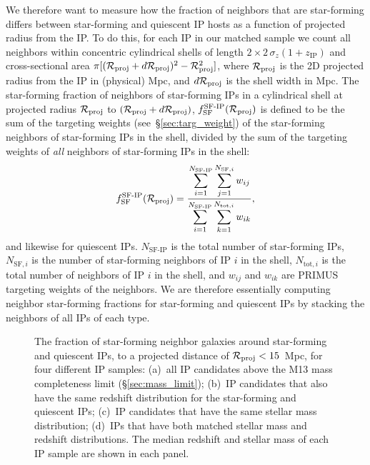 We therefore want to measure how the fraction of neighbors that are star-forming differs 
between star-forming and quiescent IP hosts as a function of projected radius from 
the IP.
To do this, for each IP in our matched sample we count all neighbors within 
concentric cylindrical shells of length ${2\times2\,\sigma_{z}(1+z_{\text{IP}})}$
and cross-sectional area
${\pi[(\mathcal{R}_{\text{proj}}+d\mathcal{R}_{\text{proj}})^2-\mathcal{R}_{\text{proj}}^2]}$, where $\mathcal{R}_{\text{proj}}$ is the 2D projected radius from the IP in (physical) Mpc, and $d\mathcal{R}_{\text{proj}}$ is the shell width in Mpc.
The star-forming fraction of neighbors of star-forming IPs in a cylindrical shell 
at projected radius $\mathcal{R}_{\text{proj}}$ to ${(\mathcal{R}_{\text{proj}}+d\mathcal{R}_{\text{proj}})}$, $f^{\textrm{SF-IP}}_{\textrm{SF}}
(\mathcal{R}_{\text{proj}})$ is defined to be the sum of the targeting weights (see~\S\ref{sec:targ_weight}) of the star-forming neighbors of star-forming IPs in the shell, 
divided by the sum of the
targeting weights of \emph{all} neighbors of star-forming IPs in the shell:
\begin{equation}
        f^{\textrm{SF-IP}}_{\textrm{SF}}(\Rproj) = \frac
        {\displaystyle \sum_{i=1}^{N_{\textrm{SF-IP}}} \sum_{j=1}^{N_{\textrm{SF},i}} w_{ij} }
        {\displaystyle \sum_{i=1}^{N_{\textrm{SF-IP}}} \sum_{k=1}^{N_{\textrm{tot},i}} w_{ik} },
\label{eq:SFfrac}
\end{equation}
and likewise for quiescent IPs.
$N_{\textrm{SF-IP}}$ is the total number of star-forming IPs, $N_{\textrm{SF},i}$ is the number of star-forming neighbors of IP $i$ in the shell, $N_{\textrm{tot},i}$ is the
total number of neighbors of IP $i$ in the shell, and $w_{ij}$ and $w_{ik}$ are PRIMUS targeting weights of the neighbors.
We are therefore essentially computing neighbor star-forming fractions for star-forming 
and quiescent IPs by stacking the neighbors of all IPs of each type.

\begin{figure*}
  \epstrim{0.1in 0.3in 0.4in 0.8in}
  \caption{
The fraction of star-forming neighbor galaxies around star-forming 
and quiescent IPs, to a projected distance of ${\mathcal{R}_{\text{proj}}<15}$~Mpc, 
 for four different IP samples: 
(a)~all IP candidates above the M13 mass completeness limit (\S\ref{sec:mass_limit});
(b)~IP candidates that also have the same redshift distribution for the star-forming
and quiescent IPs; 
(c)~IP candidates that have the same stellar mass distribution;
(d)~IPs that have both matched stellar mass and redshift distributions.
The median redshift and stellar mass of each IP sample are shown in each panel.
}
  \label{fig:IPsample_compare}
\end{figure*}


